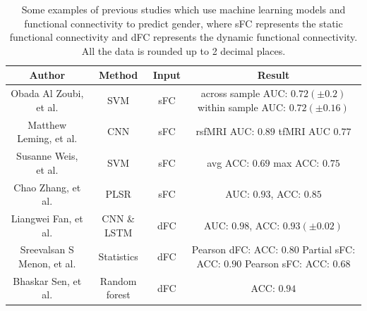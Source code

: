 \documentclass[11pt]{article}
\begin{document}
\begin{table}[H]
    \centering
    \begin{tabular}{|c|c|c|c|}
        \hline
        Author                     & Method                             & Input & Result                                        \\
        \hline
        Obada Al Zoubi, et al.     & SVM                                & sFC   & \makecell{across sample AUC: $0.72 (\pm 0.2)$ \\  within sample AUC: $0.72 (\pm 0.16)$}       \\
        \hline
        Matthew Leming, et al.     & CNN                                & sFC   & \makecell{rsfMRI AUC: $0.89$                  \\ tfMRI AUC $0.77$}   \\
        \hline
        Susanne Weis, et al.       & SVM                                & sFC   & \makecell{avg ACC: $0.69$                     \\ max ACC: $0.75$} \\
        \hline
        Chao Zhang, et al.         & PLSR                               & sFC   & AUC: $0.93$, ACC: $0.85$
        \\
        \hline
        Liangwei Fan, et al.       & CNN \& LSTM                        & dFC   & AUC: $0.98$, ACC: $0.93 (\pm 0.02)$
        \\
        \hline
        Sreevalsan S Menon, et al. & Statistics                         & dFC
                                   & \makecell{Pearson dFC: ACC: $0.80$                                                         \\
        Partial sFC: ACC: $0.90$                                                                                                \\
            Pearson sFC: ACC: $0.68$}
        \\
        \hline
        Bhaskar Sen, et al.        & Random forest                      & dFC   & ACC: $0.94$                                   \\
        \hline
    \end{tabular}
    \caption{Some examples of previous studies which use machine learning models and functional connectivity to predict gender, where sFC represents the static functional connectivity and dFC represents the dynamic functional connectivity. All the data is rounded up to 2 decimal places.}
    \label{intro-previous}
\end{table}
\end{document}
